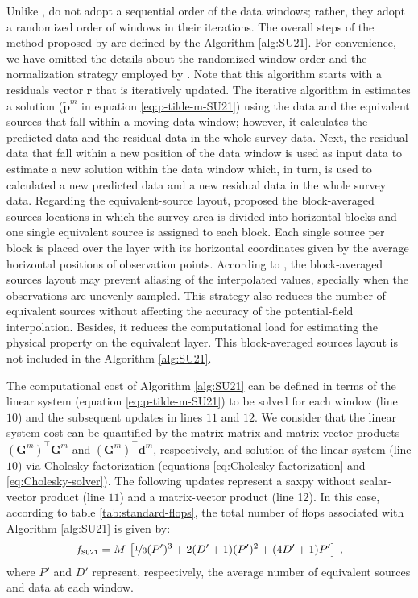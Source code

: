 Unlike \cite{leao-silva1989}, \cite{soler-uieda2021} do not adopt a sequential order of the data windows; 
rather, they adopt a randomized order of windows in their  iterations.
The overall steps of the method proposed by \cite{soler-uieda2021} are defined by the Algorithm \ref{alg:SU21}.
For convenience, we have omitted  the details about the randomized window order and the normalization strategy 
employed by \cite{soler-uieda2021}. 
Note that this algorithm starts with a residuals vector $\mathbf{r}$ that is iteratively updated.
The  iterative algorithm in \cite{soler-uieda2021} estimates a solution 
($\tilde{\mathbf{p}}^{m}$ in equation \ref{eq:p-tilde-m-SU21}) using the data and 
the equivalent sources that fall within a moving-data window; however, it calculates the predicted data and 
the residual data in the whole survey data. 
Next, the residual data  that fall within a new position of the data window is used as input data to estimate a new 
solution within the data window which, in turn, is used to calculated a new predicted data and a new residual data 
in the whole survey data.
Regarding the equivalent-source layout, \cite{soler-uieda2021} proposed the block-averaged sources locations 
in which the survey area is divided into horizontal blocks and one single equivalent source is assigned to each block. 
Each single source per block is placed over the layer with its horizontal coordinates given by the average horizontal 
positions of observation points. 
According to \cite{soler-uieda2021}, the block-averaged sources layout may prevent aliasing of the interpolated 
values, specially when the observations are unevenly sampled.
This strategy also reduces the number of equivalent sources without affecting the accuracy of the potential-field interpolation. 
Besides, it reduces the computational load for estimating the physical property on the equivalent layer.
This block-averaged sources layout is not included in the Algorithm \ref{alg:SU21}.

The computational cost of Algorithm \ref{alg:SU21} can be defined in terms of the linear
system (equation \ref{eq:p-tilde-m-SU21}) to be solved for each window (line $10$) and the 
subsequent updates in lines $11$ and $12$.
We consider that the linear system cost can be quantified by the matrix-matrix and 
matrix-vector products $\left(\mathbf{G}^{m}\right)^{\top}\mathbf{G}^{m}$ and
$\left(\mathbf{G}^{m}\right)^{\top}\mathbf{d}^{m}$, respectively, 
and solution of the linear system (line $10$) via Cholesky factorization (equations 
\ref{eq:Cholesky-factorization} and \ref{eq:Cholesky-solver}).
The following updates represent a saxpy without scalar-vector product (line $11$) and a 
matrix-vector product (line 12). In this case, according to table \ref{tab:standard-flops},
the total number of flops associated with Algorithm \ref{alg:SU21} is given by:
\begin{equation}
	f_{\mathtt{SU21}} = M \, 
	\left[ \nicefrac{1}{3}(P')^3 + 2(D'+1)(P')^{2} + (4D'+1)P' \right] \: ,
	\label{flops:SU21}
\end{equation}
where $P'$ and $D'$ represent, respectively, the average number of equivalent sources and 
data at each window.


